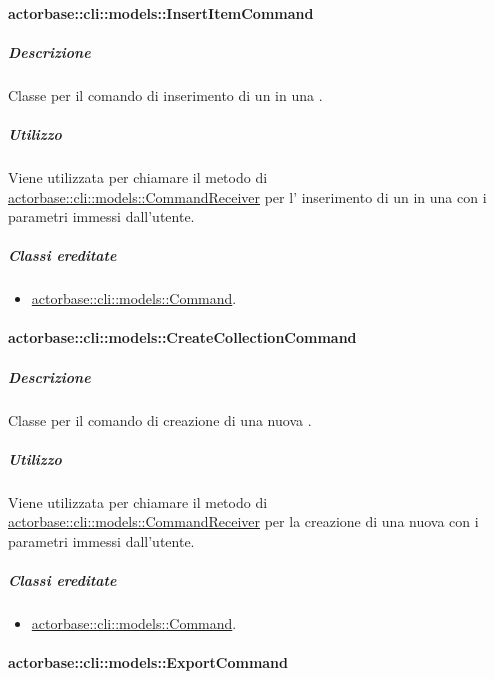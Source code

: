 \documentclass{scalatekids-article}
\begin{document}
\paragraph{actorbase::cli::models::InsertItemCommand}
\label{sec:actorbase::cli::models::InsertItemCommand}

\subparagraph{Descrizione}

Classe per il comando di inserimento di un  in una
.

\subparagraph{Utilizzo}

Viene utilizzata per chiamare il metodo di \hyperref[sec:actorbase::cli::models::CommandReceiver]{actorbase::cli::models::CommandReceiver} per l' inserimento di un  in una  con i parametri immessi dall'utente.

\subparagraph{Classi ereditate}

\begin{itemize}
\item \hyperref[sec:actorbase::cli::models::Command]{actorbase::cli::models::Command}.
\end{itemize}

\paragraph{actorbase::cli::models::CreateCollectionCommand}
\label{sec:actorbase::cli::models::CreateCollectionCommand}

\subparagraph{Descrizione}

Classe per il comando di creazione di una nuova .

\subparagraph{Utilizzo}

Viene utilizzata per chiamare il metodo di
\hyperref[sec:actorbase::cli::models::CommandReceiver]{actorbase::cli::models::CommandReceiver} per la creazione di una nuova
 con i parametri immessi dall'utente.

\subparagraph{Classi ereditate}

\begin{itemize}
\item \hyperref[sec:actorbase::cli::models::Command]{actorbase::cli::models::Command}.
\end{itemize}

\paragraph{actorbase::cli::models::ExportCommand}
\label{sec:actorbase::cli::models::ExportCommand}
\end{document}
